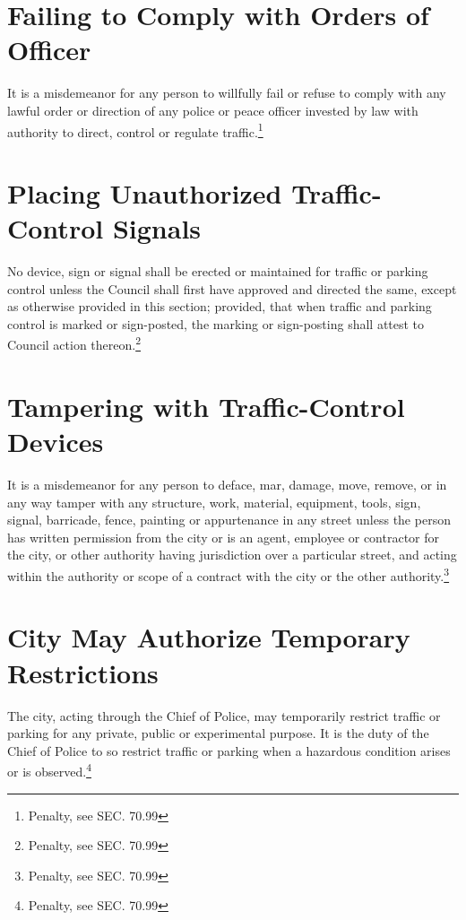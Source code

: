 \section{Failing to Comply with Orders of Officer}
It is a misdemeanor for any person to willfully fail or refuse to comply with any lawful order or direction of any police or peace officer invested by law with authority to direct, control or regulate traffic.\footnote{Penalty, see SEC. 70.99}

\section{Placing Unauthorized Traffic-Control Signals}
No device, sign or signal shall be erected or maintained for traffic or parking control unless the Council shall first have approved and directed the same, except as otherwise provided in this section; provided, that when traffic and parking control is marked or sign-posted, the marking or sign-posting shall attest to Council action thereon.\footnote{Penalty, see SEC. 70.99}

\section{Tampering with Traffic-Control Devices}
It is a misdemeanor for any person to deface, mar, damage, move, remove, or in any way tamper with any structure, work, material, equipment, tools, sign, signal, barricade, fence, painting or appurtenance in any street unless the person has written permission from the city or is an agent, employee or contractor for the city, or other authority having jurisdiction over a particular street, and acting within the authority or scope of a contract with the city or the other authority.\footnote{Penalty, see SEC. 70.99}

\section{City May Authorize Temporary Restrictions}
The city, acting through the Chief of Police, may temporarily restrict traffic or parking for any private, public or experimental purpose.  It is the duty of the Chief of Police to so restrict traffic or parking when a hazardous condition arises or is observed.\footnote{Penalty, see SEC. 70.99}

